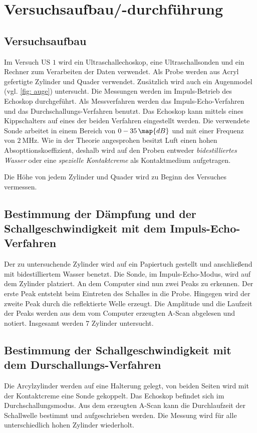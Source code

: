 \section{Versuchsaufbau/-durchführung}

\subsection{Versuchsaufbau}
Im Versuch US $1$ wird ein Ultraschallechoskop, eine Ultraschallsonden und ein Rechner
zum Verarbeiten der Daten verwendet.
Als Probe werden aus Acryl gefertigte Zylinder und Quader verwendet.
Zusätzlich wird auch ein Augenmodel (vgl. \ref{fig: auge}) untersucht.
Die Messungen werden im Impuls-Betrieb des Echoskop durchgeführt. Als Messverfahren werden
das Impuls-Echo-Verfahren und das Durchschallungs-Verfahren benutzt. Das Echoskop kann mittels
eines Kippschalters auf eines der beiden Verfahren eingestellt werden.
Die verwendete Sonde arbeitet in einem Bereich von $0-35\,\map{dB}$ und mit einer
Frequenz von $\SI{2}{\mega\hertz}$.
Wie in der Theorie angesprohen besitzt Luft einen hohen Absopttionskoeffizient, deshalb wird
auf den Proben entweder \emph{bidestilliertes Wasser} oder eine \emph{spezielle Kontaktcreme}
als Kontaktmedium aufgetragen.


Die Höhe von jedem Zylinder und Quader wird zu  Beginn des Versuches vermessen.
\subsection{Bestimmung der Dämpfung und der Schallgeschwindigkeit mit dem Impuls-Echo-Verfahren}
Der zu untersuchende Zylinder wird auf ein Papiertuch gestellt und anschließend
mit bidestilliertem Wasser benetzt. Die Sonde, im Impuls-Echo-Modus, wird auf dem
Zylinder platziert. An dem Computer sind nun zwei Peaks zu erkennen. Der erste Peak
entsteht beim Eintreten des Schalles in die Probe. Hingegen wird der zweite Peak
durch die reflektierte Welle erzeugt. Die Amplitude und die Laufzeit der Peaks
werden aus dem vom Computer erzeugten A-Scan abgelesen und notiert.
Insgesamt werden $7$ Zylinder untersucht.

\subsection{Bestimmung der Schallgeschwindigkeit mit dem Durschallungs-Verfahren}

Die Arcylzylinder werden auf eine Halterung gelegt, von beiden Seiten wird
mit der Kontaktcreme eine Sonde gekoppelt. Das Echoskop befindet sich im
Durchschallungsmodus. Aus dem erzeugten A-Scan kann die Durchlaufzeit der
Schallwelle bestimmt und aufgeschrieben werden. Die Messung wird für alle unterschiedlich
hohen Zylinder wiederholt.

